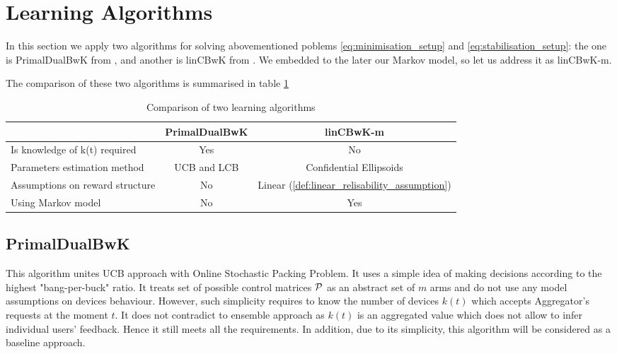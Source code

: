 \section{Learning Algorithms}
In this section we apply two algorithms for solving abovementioned poblems \ref{eq:minimisation_setup} and \ref{eq:stabilisation_setup}: the one is PrimalDualBwK from \cite{Badanidiyuru2013}, and another is linCBwK from \cite{Agrawal2015}. We embedded to the later our Markov model, so let us address it as linCBwK-m.

The comparison of these two algorithms is summarised in table \ref{table:algorithms_comparison}

\begin{table}[h!]
    \centering
    \label{table:algorithms_comparison}
    \begin{tabular}{|l|c|c|}
        \hline
         & PrimalDualBwK & linCBwK-m \\
         \hline \hline 
         Is knowledge of k(t) required & Yes & No \\
         \hline 
         Parameters estimation method & UCB and LCB & Confidential Ellipsoids \\
         \hline
         Assumptions on reward structure & No & Linear (\ref{def:linear_relisability_assumption}) \\
         \hline 
         Using Markov model & No & Yes \\
         \hline
    \end{tabular}
    \caption{Comparison of two learning algorithms}
\end{table}

\subsection{PrimalDualBwK}

This algorithm unites UCB approach with Online Stochastic Packing Problem. It uses a simple idea of making decisions according to the highest "bang-per-buck" ratio. It treats set of possible control matrices $\operatorname{\mathcal{P}}$ as an abstract set of $m$ arms and do not use any model assumptions on devices behaviour. However, such simplicity requires to know the number of devices $k(t)$ which accepts Aggregator's requests at the moment $t$. It does not contradict to ensemble approach as $k(t)$ is an aggregated value which does not allow to infer individual users' feedback. Hence it still meets all the requirements. In addition, due to its simplicity, this algorithm will be considered as a baseline approach.

